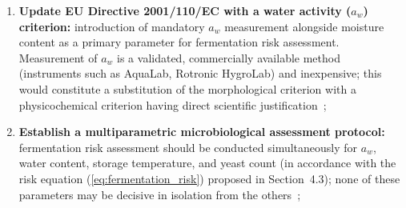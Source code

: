 \begin{enumerate}
    \item \textbf{Update EU Directive 2001/110/EC with a water
          activity ($a_w$) criterion:}
          introduction of mandatory $a_w$ measurement alongside
          moisture content as a primary parameter for fermentation
          risk assessment. Measurement of $a_w$ is a validated,
          commercially available method (instruments such as
          AquaLab, Rotronic HygroLab) and inexpensive; this would
          constitute a substitution of the morphological criterion
          with a physicochemical criterion having direct scientific
          justification~\cite{ruegg1981,zamora2006};

    \item \textbf{Establish a multiparametric microbiological
          assessment protocol:} fermentation risk assessment should
          be conducted simultaneously for $a_w$, water content,
          storage temperature, and yeast count (in accordance with
          the risk equation (\ref{eq:fermentation_risk}) proposed
          in Section~4.3); none of these parameters may be
          decisive in isolation from the
          others~\cite{analytica2020,apinz2021};



\end{enumerate}
